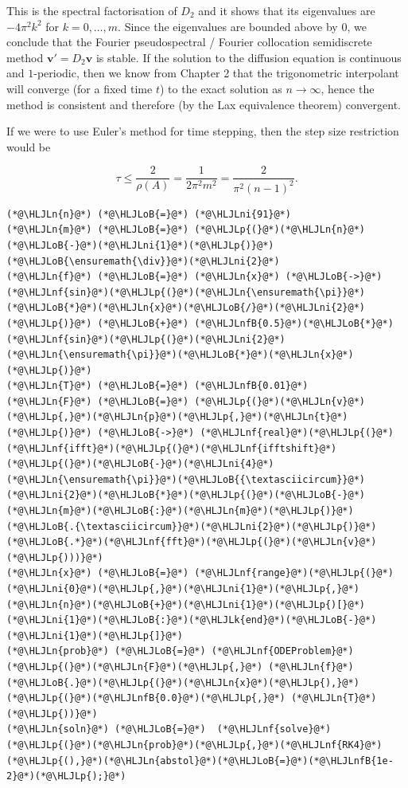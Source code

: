 \documentclass[12pt,a4paper]{article}
\newcommand{\HLJLk}[1]{\textcolor[RGB]{148,91,176}{\textbf{#1}}}
\newcommand{\HLJLn}[1]{#1}
\newcommand{\HLJLnf}[1]{\textcolor[RGB]{66,102,213}{#1}}
\newcommand{\HLJLnfB}[1]{\textcolor[RGB]{59,151,46}{#1}}
\newcommand{\HLJLni}[1]{\textcolor[RGB]{59,151,46}{#1}}
\newcommand{\HLJLoB}[1]{\textcolor[RGB]{102,102,102}{\textbf{#1}}}
\newcommand{\HLJLp}[1]{#1}
\begin{document}
This is the spectral factorisation of $D_2$ and it shows that its eigenvalues are $-4\pi^2k^2$ for $k = 0, \ldots, m$.  Since the eigenvalues are bounded above by $0$, we conclude that the Fourier pseudospectral / Fourier collocation semidiscrete method $\mathbf{v}' = D_2\mathbf{v}$ is stable.  If the solution to the diffusion equation is continuous and $1$-periodic, then we know from Chapter 2 that the trigonometric interpolant will converge (for a fixed time $t$) to the exact solution as $n \to \infty$, hence the method is consistent and therefore (by the Lax equivalence theorem) convergent.

If we were to use Euler's method for time stepping, then the step size restriction would be

\[
\tau \leq \frac{2}{\rho(A)} = \frac{1}{2\pi^2 m^2} = \frac{2}{\pi^2 (n-1)^2}.
\]

\begin{lstlisting}
(*@\HLJLn{n}@*) (*@\HLJLoB{=}@*) (*@\HLJLni{91}@*)
(*@\HLJLn{m}@*) (*@\HLJLoB{=}@*) (*@\HLJLp{(}@*)(*@\HLJLn{n}@*)(*@\HLJLoB{-}@*)(*@\HLJLni{1}@*)(*@\HLJLp{)}@*)(*@\HLJLoB{\ensuremath{\div}}@*)(*@\HLJLni{2}@*)
(*@\HLJLn{f}@*) (*@\HLJLoB{=}@*) (*@\HLJLn{x}@*) (*@\HLJLoB{->}@*) (*@\HLJLnf{sin}@*)(*@\HLJLp{(}@*)(*@\HLJLn{\ensuremath{\pi}}@*)(*@\HLJLoB{*}@*)(*@\HLJLn{x}@*)(*@\HLJLoB{/}@*)(*@\HLJLni{2}@*)(*@\HLJLp{)}@*) (*@\HLJLoB{+}@*) (*@\HLJLnfB{0.5}@*)(*@\HLJLoB{*}@*)(*@\HLJLnf{sin}@*)(*@\HLJLp{(}@*)(*@\HLJLni{2}@*)(*@\HLJLn{\ensuremath{\pi}}@*)(*@\HLJLoB{*}@*)(*@\HLJLn{x}@*)(*@\HLJLp{)}@*)
(*@\HLJLn{T}@*) (*@\HLJLoB{=}@*) (*@\HLJLnfB{0.01}@*)
(*@\HLJLn{F}@*) (*@\HLJLoB{=}@*) (*@\HLJLp{(}@*)(*@\HLJLn{v}@*)(*@\HLJLp{,}@*)(*@\HLJLn{p}@*)(*@\HLJLp{,}@*)(*@\HLJLn{t}@*)(*@\HLJLp{)}@*) (*@\HLJLoB{->}@*) (*@\HLJLnf{real}@*)(*@\HLJLp{(}@*)(*@\HLJLnf{ifft}@*)(*@\HLJLp{(}@*)(*@\HLJLnf{ifftshift}@*)(*@\HLJLp{(}@*)(*@\HLJLoB{-}@*)(*@\HLJLni{4}@*)(*@\HLJLn{\ensuremath{\pi}}@*)(*@\HLJLoB{{\textasciicircum}}@*)(*@\HLJLni{2}@*)(*@\HLJLoB{*}@*)(*@\HLJLp{(}@*)(*@\HLJLoB{-}@*)(*@\HLJLn{m}@*)(*@\HLJLoB{:}@*)(*@\HLJLn{m}@*)(*@\HLJLp{)}@*)(*@\HLJLoB{.{\textasciicircum}}@*)(*@\HLJLni{2}@*)(*@\HLJLp{)}@*) (*@\HLJLoB{.*}@*)(*@\HLJLnf{fft}@*)(*@\HLJLp{(}@*)(*@\HLJLn{v}@*)(*@\HLJLp{)))}@*)
(*@\HLJLn{x}@*) (*@\HLJLoB{=}@*) (*@\HLJLnf{range}@*)(*@\HLJLp{(}@*)(*@\HLJLni{0}@*)(*@\HLJLp{,}@*)(*@\HLJLni{1}@*)(*@\HLJLp{,}@*)(*@\HLJLn{n}@*)(*@\HLJLoB{+}@*)(*@\HLJLni{1}@*)(*@\HLJLp{)[}@*)(*@\HLJLni{1}@*)(*@\HLJLoB{:}@*)(*@\HLJLk{end}@*)(*@\HLJLoB{-}@*)(*@\HLJLni{1}@*)(*@\HLJLp{]}@*)
(*@\HLJLn{prob}@*) (*@\HLJLoB{=}@*) (*@\HLJLnf{ODEProblem}@*)(*@\HLJLp{(}@*)(*@\HLJLn{F}@*)(*@\HLJLp{,}@*) (*@\HLJLn{f}@*)(*@\HLJLoB{.}@*)(*@\HLJLp{(}@*)(*@\HLJLn{x}@*)(*@\HLJLp{),}@*) (*@\HLJLp{(}@*)(*@\HLJLnfB{0.0}@*)(*@\HLJLp{,}@*) (*@\HLJLn{T}@*)(*@\HLJLp{))}@*)
(*@\HLJLn{soln}@*) (*@\HLJLoB{=}@*)  (*@\HLJLnf{solve}@*)(*@\HLJLp{(}@*)(*@\HLJLn{prob}@*)(*@\HLJLp{,}@*)(*@\HLJLnf{RK4}@*)(*@\HLJLp{(),}@*)(*@\HLJLn{abstol}@*)(*@\HLJLoB{=}@*)(*@\HLJLnfB{1e-2}@*)(*@\HLJLp{);}@*)
\end{lstlisting}
\end{document}
